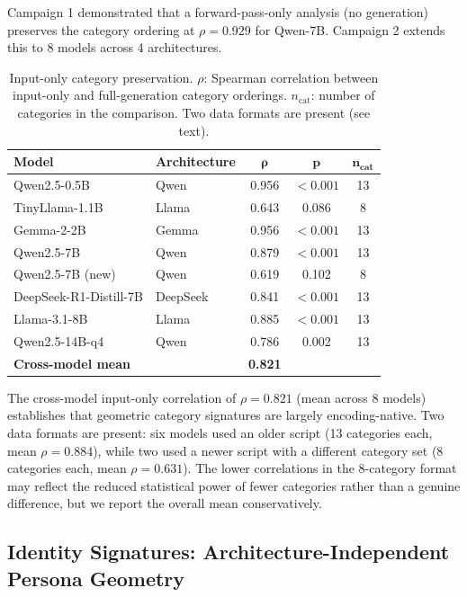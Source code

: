 \documentclass[11pt,a4paper]{article}
\begin{document}
Campaign 1 demonstrated that a forward-pass-only analysis (no generation) preserves the category ordering at $\rho = 0.929$ for Qwen-7B. Campaign 2 extends this to 8 models across 4 architectures.

\begin{table}[H]
\centering
\caption{Input-only category preservation. $\rho$: Spearman correlation between input-only and full-generation category orderings. $n_{\text{cat}}$: number of categories in the comparison. Two data formats are present (see text).}
\label{tab:input_only}
\begin{tabular}{llccc}
\toprule
\textbf{Model} & \textbf{Architecture} & $\bm{\rho}$ & $\bm{p}$ & $\bm{n_{\text{cat}}}$ \\
\midrule
Qwen2.5-0.5B & Qwen & 0.956 & $< 0.001$ & 13 \\
TinyLlama-1.1B & Llama & 0.643 & 0.086 & 8 \\
Gemma-2-2B & Gemma & 0.956 & $< 0.001$ & 13 \\
Qwen2.5-7B & Qwen & 0.879 & $< 0.001$ & 13 \\
Qwen2.5-7B (new) & Qwen & 0.619 & 0.102 & 8 \\
DeepSeek-R1-Distill-7B & DeepSeek & 0.841 & $< 0.001$ & 13 \\
Llama-3.1-8B & Llama & 0.885 & $< 0.001$ & 13 \\
Qwen2.5-14B-q4 & Qwen & 0.786 & 0.002 & 13 \\
\midrule
\textbf{Cross-model mean} & & \textbf{0.821} & & \\
\bottomrule
\end{tabular}
\end{table}

The cross-model input-only correlation of $\rho = 0.821$ (mean across 8 models) establishes that geometric category signatures are largely encoding-native. Two data formats are present: six models used an older script (13 categories each, mean $\rho = 0.884$), while two used a newer script with a different category set (8 categories each, mean $\rho = 0.631$). The lower correlations in the 8-category format may reflect the reduced statistical power of fewer categories rather than a genuine difference, but we report the overall mean conservatively.

\subsection{Identity Signatures: Architecture-Independent Persona Geometry}
\label{sec:identity}
\end{document}
